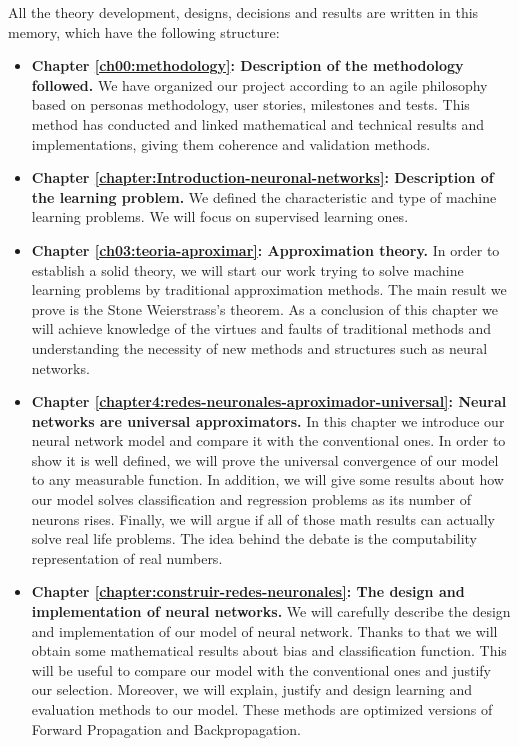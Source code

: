 All the theory development, designs, decisions and results are 
written in this memory, which have the following structure: 
\begin{itemize}
 \item \textbf{Chapter \ref{ch00:methodology}: Description of the methodology followed.} We have organized our project according to an agile philosophy  based on personas methodology, user stories, milestones and tests. This method has conducted and linked mathematical and technical results and implementations, giving them coherence and validation methods. 

 \item \textbf{Chapter \ref{chapter:Introduction-neuronal-networks}: Description of the learning problem.} We defined the characteristic and type of machine learning problems. We will focus on supervised learning ones. 

 \item \textbf{Chapter \ref{ch03:teoria-aproximar}:  Approximation theory.} In order to establish a solid theory, we will start our work trying to solve machine learning problems by traditional approximation methods.  The main result we prove is the Stone Weierstrass's theorem. As a conclusion of this chapter we will achieve knowledge of the virtues and faults of traditional methods and understanding the necessity of new methods and structures such as neural networks. 

 \item \textbf{Chapter \ref{chapter4:redes-neuronales-aproximador-universal}: Neural networks are universal approximators.}  In this chapter we introduce our neural 
 network model and compare it with the conventional ones. In order to show it is well 
 defined, we will prove the universal convergence of our model to any measurable 
 function. In addition, we will give some results about how our model solves 
 classification and regression problems as its number of neurons rises. Finally, we 
 will argue if all of those math results can actually solve real life problems. The 
 idea behind the debate is the computability representation of real numbers. 

 \item \textbf{Chapter  \ref{chapter:construir-redes-neuronales}: The design and implementation of neural networks.} We will carefully  describe the design and 
 implementation of our model of neural network. Thanks to that we will obtain some 
 mathematical results about bias and classification function. This will be useful to 
 compare our model with the conventional ones and justify 
our selection. Moreover, we will explain, justify and design  learning and evaluation 
methods to our model. These methods are optimized versions of Forward Propagation and 
Backpropagation. 


\end{itemize}
